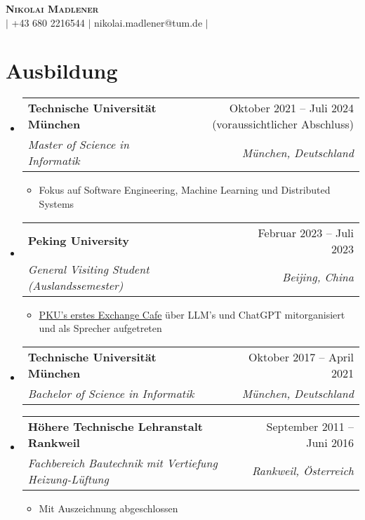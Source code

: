 \documentclass[letterpaper,11pt]{article}
\makeatletter
\newcommand{\resumeItem}[1]{
  \item\small{
    {#1 \vspace{-2pt}}
  }
}
\newcommand{\resumeSubheading}[4]{
  \vspace{-2pt}\item
    \begin{tabular*}{0.97\textwidth}[t]{l@{\extracolsep{\fill}}r}
      \textbf{#1} & #2 \\
      \textit{\small#3} & \textit{\small #4} \\
    \end{tabular*}\vspace{-7pt}
}
\newcommand{\resumeSubHeadingListStart}{\begin{itemize}[leftmargin=0.15in, label={}]}
\newcommand{\resumeSubHeadingListEnd}{\end{itemize}}
\newcommand{\resumeItemListStart}{\begin{itemize}}
\newcommand{\resumeItemListEnd}{\end{itemize}\vspace{-5pt}}
\makeatother
\begin{document}

\begin{center}
  \textbf{\Huge \scshape Nikolai Madlener} \\ \vspace{1pt}
  \href{https://www.linkedin.com/in/nikolai-madlener-163b14169/}{\faLinkedinSquare} $|$
  \small +43 680 2216544 $|$ {{nikolai.madlener@tum.de}} $|$
  \href{https://github.com/NikolaiMadlener}{\faGithub}
  
\end{center}

\section{Ausbildung}  
\resumeSubHeadingListStart
  \resumeSubheading
      {Technische Universität München}{Oktober 2021 -- Juli 2024 (voraussichtlicher Abschluss)}
      {Master of Science in Informatik}{München, Deutschland}
      \resumeItemListStart
        \resumeItem{Fokus auf Software Engineering, Machine Learning und Distributed Systems}
      \resumeItemListEnd
    \resumeSubheading
      {Peking University}{Februar 2023 -- Juli 2023}
      {General Visiting Student (Auslandssemester)}{Beijing, China}
      \resumeItemListStart
        \resumeItem{\href{https://newsen.pku.edu.cn/news_events/news/campus/13276.html}{PKU's erstes Exchange Cafe} über LLM's und ChatGPT mitorganisiert und als Sprecher aufgetreten}
      \resumeItemListEnd

    \resumeSubheading
      {Technische Universität München}{Oktober 2017 -- April 2021}
      {Bachelor of Science in Informatik}{München, Deutschland}
    \resumeSubheading
      {Höhere Technische Lehranstalt Rankweil}{September 2011 -- Juni 2016}
      {Fachbereich Bautechnik mit Vertiefung Heizung-Lüftung}{Rankweil, Österreich}
      \resumeItemListStart
      \resumeItem{Mit Auszeichnung abgeschlossen}
      \resumeItemListEnd
  \resumeSubHeadingListEnd
\end{document}
